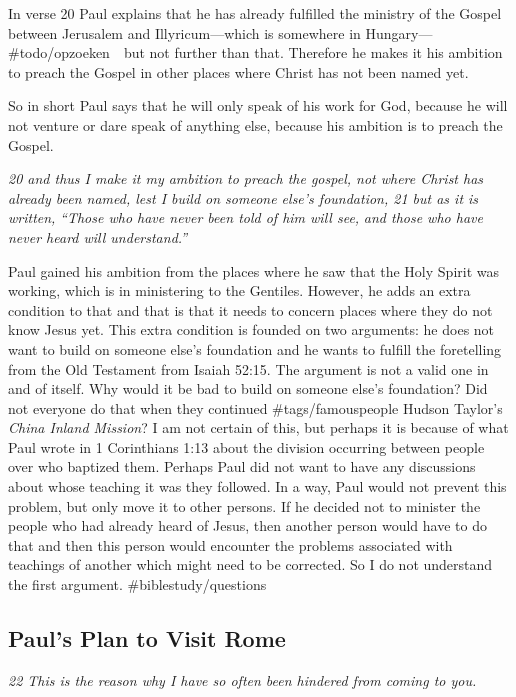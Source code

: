 In verse 20 Paul explains that he has already fulfilled the ministry of
the Gospel between Jerusalem and Illyricum---which is somewhere in
Hungary--- \#todo/opzoeken~~but not further than that. Therefore he
makes it his ambition to preach the Gospel in other places where Christ
has not been named yet.

So in short Paul says that he will only speak of his work for God,
because he will not venture or dare speak of anything else, because his
ambition is to preach the Gospel.

\emph{20 and thus I make it my ambition to preach the gospel, not where
Christ has already been named, lest I build on someone else's
foundation, 21 but as it is written,} \emph{``Those who have never been
told of him will see,} \emph{and those who have never heard will
understand.''}

Paul gained his ambition from the places where he saw that the Holy
Spirit was working, which is in ministering to the Gentiles. However, he
adds an extra condition to that and that is that it needs to concern
places where they do not know Jesus yet. This extra condition is founded
on two arguments: he does not want to build on someone else's foundation
and he wants to fulfill the foretelling from the Old Testament from
Isaiah 52:15. The argument is not a valid one in and of itself. Why
would it be bad to build on someone else's foundation? Did not everyone
do that when they continued \#tags/famouspeople Hudson Taylor's
\emph{China Inland Mission}? I am not certain of this, but perhaps it is
because of what Paul wrote in 1 Corinthians 1:13 about the division
occurring between people over who baptized them. Perhaps Paul did not
want to have any discussions about whose teaching it was they followed.
In a way, Paul would not prevent this problem, but only move it to other
persons. If he decided not to minister the people who had already heard
of Jesus, then another person would have to do that and then this person
would encounter the problems associated with teachings of another which
might need to be corrected. So I do not understand the first argument.
\#biblestudy/questions

\subsection{Paul's Plan to Visit Rome} \emph{22 This is the reason why I
have so often been hindered from coming to you.}


